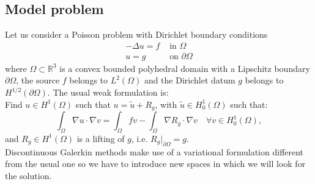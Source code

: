 \documentclass[12pt, a4paper]{article}
\theoremstyle{definition}
\theoremstyle{plain}
\theoremstyle{plain}
\theoremstyle{definition}
\begin{document}
\subsection{Model problem}
Let us consider a Poisson problem with Dirichlet boundary conditions
\begin{align} \label{eq:poisson}
	-\Delta u = f & \mbox{ in } \Omega\\
			u = g & \mbox{ on } \partial \Omega
\end{align}
where $\Omega \subset \mathbb{R}^3$ is a convex bounded polyhedral domain with 
a Lipschitz boundary $\partial \Omega$, the source $f$ belongs to $L^2(\Omega)$ 
and the Dirichlet datum $g$ belongs to $H^{1/2}(\partial \Omega)$.
The usual weak formulation is:\\
Find $u \in H^1(\Omega)$ such that $u = \tilde{u} + R_g$, with $\tilde{u} \in H^1_0(\Omega)$ such that:
\begin{equation} \label{eq:wform}
	\int_\Omega \nabla u \cdot \nabla v
	= \int_\Omega fv - \int_\Omega \nabla R_g \cdot \nabla v \quad \forall v 
	\in H^1_0(\Omega),
\end{equation}
and $R_g \in H^1(\Omega)$ is a lifting of $g$, i.e. $R_g|_{\partial \Omega} = g$.\\
Discontinuous Galerkin methods make use of a variational formulation different 
from the usual one so we have to introduce new spaces in which we will look for 
the solution.
\end{document}
